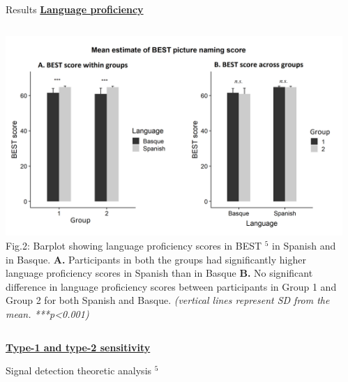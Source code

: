 \documentclass[final,12pt]{beamer}
\begin{document}
\begin{frame}[t]
\begin{columns}[t]
\begin{column}{\halfpagecol}
  \end{column}
  

  \begin{column}{\halfpagecol}
  \vspace{-1em}
  \begin{block}{Results}
  \textbf{\underline{Language proficiency}}
  \begin{column}{\linewidth}
  
  \end{column}
    
  \begin{column}{\linewidth}
          \includegraphics[width=\linewidth]{images/bestscoreplot}
          \scriptsize{\tiny{
 Fig.2: Barplot showing language proficiency scores in BEST $^{5}$ in Spanish and in Basque.
 \textbf{A.}
 Participants in both the groups had significantly higher language proficiency scores in Spanish than in Basque
 \textbf{B.} No significant difference in language proficiency scores between participants in Group 1 and Group 2 for both Spanish and Basque.
 \textit{(vertical lines represent SD from the mean. ***p\textless0.001)}}
 }
 \end{column}
  
      \vspace{1.2em}
    \textbf{\underline{Type-1 and type-2 sensitivity}}
    \begin{description}
        \item \small{Signal detection theoretic analysis $^{5}$}
    \end{description}
        \vspace{1em}


\end{block}
\end{column}
\end{columns}
\end{frame}
\end{document}
